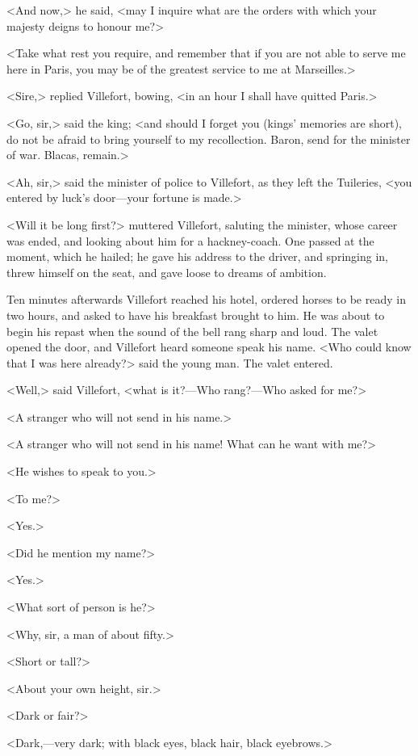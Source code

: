  <And now,> he said, <may I inquire what are the orders with which your majesty deigns to honour me?> 

 <Take what rest you require, and remember that if you are not able to serve me here in Paris, you may be of the greatest service to me at Marseilles.> 

 <Sire,> replied Villefort, bowing, <in an hour I shall have quitted Paris.> 

 <Go, sir,> said the king; <and should I forget you (kings' memories are short), do not be afraid to bring yourself to my recollection. Baron, send for the minister of war. Blacas, remain.> 

 <Ah, sir,> said the minister of police to Villefort, as they left the Tuileries, <you entered by luck's door—your fortune is made.> 

 <Will it be long first?> muttered Villefort, saluting the minister, whose career was ended, and looking about him for a hackney-coach. One passed at the moment, which he hailed; he gave his address to the driver, and springing in, threw himself on the seat, and gave loose to dreams of ambition. 

 Ten minutes afterwards Villefort reached his hotel, ordered horses to be ready in two hours, and asked to have his breakfast brought to him. He was about to begin his repast when the sound of the bell rang sharp and loud. The valet opened the door, and Villefort heard someone speak his name.  <Who could know that I was here already?> said the young man. The valet entered. 

 <Well,> said Villefort, <what is it?—Who rang?—Who asked for me?> 

 <A stranger who will not send in his name.> 

 <A stranger who will not send in his name! What can he want with me?> 

 <He wishes to speak to you.> 

 <To me?> 

 <Yes.> 

 <Did he mention my name?> 

 <Yes.> 

 <What sort of person is he?> 

 <Why, sir, a man of about fifty.> 

 <Short or tall?> 

 <About your own height, sir.> 

 <Dark or fair?> 

 <Dark,—very dark; with black eyes, black hair, black eyebrows.> 

